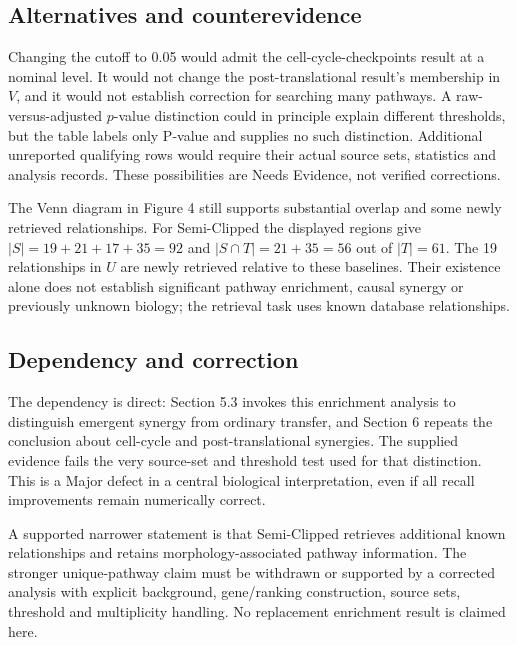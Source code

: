 \documentclass[10pt]{article}
\begin{document}
\subsection*{Alternatives and counterevidence}
Changing the cutoff to 0.05 would admit the cell-cycle-checkpoints result at a nominal level. It would not change the post-translational result’s membership in \(V\), and it would not establish correction for searching many pathways. A raw-versus-adjusted \(p\)-value distinction could in principle explain different thresholds, but the table labels only P-value and supplies no such distinction. Additional unreported qualifying rows would require their actual source sets, statistics and analysis records. These possibilities are Needs Evidence, not verified corrections.\par
The Venn diagram in Figure 4 still supports substantial overlap and some newly retrieved relationships. For Semi-Clipped the displayed regions give \(|S|=19+21+17+35=92\) and \(|S\cap T|=21+35=56\) out of \(|T|=61\). The 19 relationships in \(U\) are newly retrieved relative to these baselines. Their existence alone does not establish significant pathway enrichment, causal synergy or previously unknown biology; the retrieval task uses known database relationships.\par
\subsection*{Dependency and correction}
The dependency is direct: Section 5.3 invokes this enrichment analysis to distinguish emergent synergy from ordinary transfer, and Section 6 repeats the conclusion about cell-cycle and post-translational synergies. The supplied evidence fails the very source-set and threshold test used for that distinction. This is a Major defect in a central biological interpretation, even if all recall improvements remain numerically correct.\par
A supported narrower statement is that Semi-Clipped retrieves additional known relationships and retains morphology-associated pathway information. The stronger unique-pathway claim must be withdrawn or supported by a corrected analysis with explicit background, gene/ranking construction, source sets, threshold and multiplicity handling. No replacement enrichment result is claimed here.\par
\end{document}
